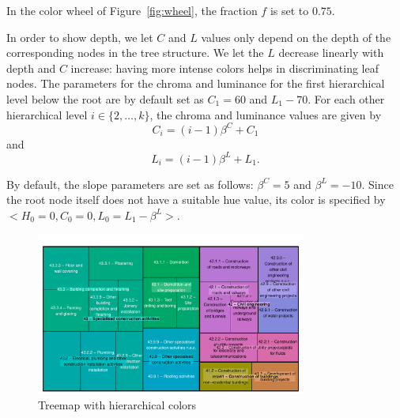 \documentclass[journal]{vgtc}                %
\begin{document}





In the color wheel of Figure~\ref{fig:wheel}, the fraction $f$ is set to $0.75$.




In order to show depth, we let $C$ and $L$ values only depend on the depth of the corresponding nodes in the tree structure. We let the $L$ decrease linearly with depth and $C$ increase: having more intense colors helps in discriminating leaf nodes. The parameters for the chroma and luminance for the first hierarchical level below the root are by default set as $C_1=60$ and $L_1-70$. For each other hierarchical level $i \in \{2, \ldots, k\}$, the chroma and luminance values are given by
\begin{equation}
C_i=(i-1)\beta^C + C_1
\end{equation}
and
\begin{equation}
L_i=(i-1)\beta^L + L_1.
\end{equation}

By default, the slope parameters are set as follows: $\beta^C=5$ and $\beta^L=-10$. Since the root node itself does not have a suitable hue value, its color is specified by $<H_0=0, C_0=0, L_0=L_1-\beta^L>$.


\begin{figure}[htb]
  \vspace{-4ex}
  \centering
  \includegraphics[width=3.5in]{treemap_F.pdf}
  \vspace{-4ex}
  \caption{Treemap with hierarchical colors}\label{fig:treemapF}
  \vspace{-4ex}
\end{figure}
\end{document}
